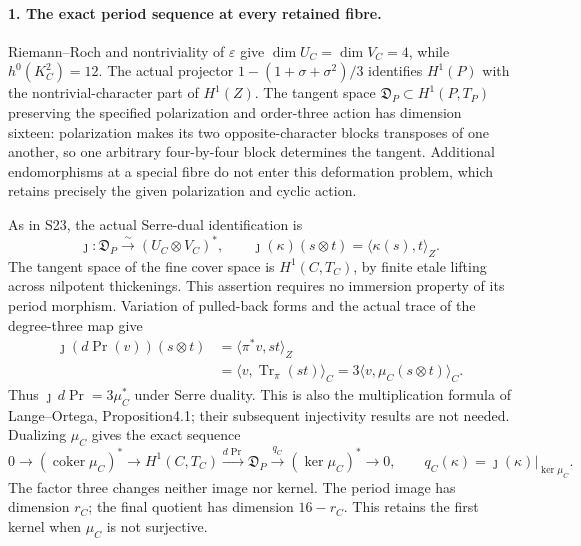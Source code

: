 \paragraph{1. The exact period sequence at every retained fibre.}
Riemann--Roch and nontriviality of $\varepsilon$ give
$\dim U_C=\dim V_C=4$, while $h^0(K_C^2)=12$.
The actual projector $1-(1+\sigma+\sigma^2)/3$ identifies
$H^1(P)$ with the nontrivial-character part of $H^1(Z)$.
The tangent space $\mathfrak D_P\subset H^1(P,T_P)$
preserving the specified polarization and order-three action
has dimension sixteen: polarization makes its two
opposite-character blocks transposes of one another, so one
arbitrary four-by-four block determines the tangent.
Additional endomorphisms at a special fibre do not enter
this deformation problem, which retains precisely the given
polarization and cyclic action.

As in S23, the actual Serre-dual identification is
\[
 \jmath:\mathfrak D_P\xrightarrow{\sim}(U_C\otimes V_C)^*,
 \qquad \jmath(\kappa)(s\otimes t)
                         =\langle\kappa(s),t\rangle_Z.
 \tag{F1S29.4}
\]
The tangent space of the fine cover space is $H^1(C,T_C)$,
by finite etale lifting across nilpotent thickenings.
This assertion requires no immersion property of its period
morphism. Variation of pulled-back forms and the actual trace
of the degree-three map give
\[
 \begin{split}
 \jmath(d\operatorname{Pr}(v))(s\otimes t)
   &=\langle\pi^*v,st\rangle_Z\\
   &=\langle v,\operatorname{Tr}_{\pi}(st)\rangle_C
     =3\langle v,\mu_C(s\otimes t)\rangle_C.
 \end{split}
 \tag{F1S29.5}
\]
Thus $\jmath\,d\operatorname{Pr}=3\mu_C^*$ under Serre
duality. This is also the multiplication formula of
Lange--Ortega, Proposition4.1; their subsequent injectivity
results are not needed. Dualizing $\mu_C$ gives the exact
sequence
\[
 0\longrightarrow(\operatorname{coker}\mu_C)^*
 \longrightarrow H^1(C,T_C)
 \xrightarrow{d\operatorname{Pr}}\mathfrak D_P
 \xrightarrow{q_C}(\ker\mu_C)^*\longrightarrow0,
 \qquad q_C(\kappa)=\jmath(\kappa)|_{\ker\mu_C}.
 \tag{F1S29.6}
\]
The factor three changes neither image nor kernel.
The period image has dimension $r_C$; the final quotient
has dimension $16-r_C$. This retains the first kernel
when $\mu_C$ is not surjective.

